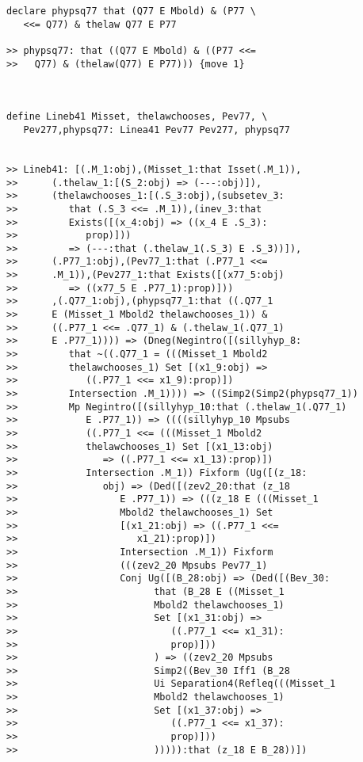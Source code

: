 \documentclass[12pt]{article}
\begin{document}
\begin{verbatim}
declare phypsq77 that (Q77 E Mbold) & (P77 \
   <<= Q77) & thelaw Q77 E P77

>> phypsq77: that ((Q77 E Mbold) & ((P77 <<=
>>   Q77) & (thelaw(Q77) E P77))) {move 1}



define Lineb41 Misset, thelawchooses, Pev77, \
   Pev277,phypsq77: Linea41 Pev77 Pev277, phypsq77


>> Lineb41: [(.M_1:obj),(Misset_1:that Isset(.M_1)),
>>      (.thelaw_1:[(S_2:obj) => (---:obj)]),
>>      (thelawchooses_1:[(.S_3:obj),(subsetev_3:
>>         that (.S_3 <<= .M_1)),(inev_3:that
>>         Exists([(x_4:obj) => ((x_4 E .S_3):
>>            prop)]))
>>         => (---:that (.thelaw_1(.S_3) E .S_3))]),
>>      (.P77_1:obj),(Pev77_1:that (.P77_1 <<=
>>      .M_1)),(Pev277_1:that Exists([(x77_5:obj)
>>         => ((x77_5 E .P77_1):prop)]))
>>      ,(.Q77_1:obj),(phypsq77_1:that ((.Q77_1
>>      E (Misset_1 Mbold2 thelawchooses_1)) &
>>      ((.P77_1 <<= .Q77_1) & (.thelaw_1(.Q77_1)
>>      E .P77_1)))) => (Dneg(Negintro([(sillyhyp_8:
>>         that ~((.Q77_1 = (((Misset_1 Mbold2
>>         thelawchooses_1) Set [(x1_9:obj) =>
>>            ((.P77_1 <<= x1_9):prop)])
>>         Intersection .M_1)))) => ((Simp2(Simp2(phypsq77_1))
>>         Mp Negintro([(sillyhyp_10:that (.thelaw_1(.Q77_1)
>>            E .P77_1)) => ((((sillyhyp_10 Mpsubs
>>            ((.P77_1 <<= (((Misset_1 Mbold2
>>            thelawchooses_1) Set [(x1_13:obj)
>>               => ((.P77_1 <<= x1_13):prop)])
>>            Intersection .M_1)) Fixform (Ug([(z_18:
>>               obj) => (Ded([(zev2_20:that (z_18
>>                  E .P77_1)) => (((z_18 E (((Misset_1
>>                  Mbold2 thelawchooses_1) Set
>>                  [(x1_21:obj) => ((.P77_1 <<=
>>                     x1_21):prop)])
>>                  Intersection .M_1)) Fixform
>>                  (((zev2_20 Mpsubs Pev77_1)
>>                  Conj Ug([(B_28:obj) => (Ded([(Bev_30:
>>                        that (B_28 E ((Misset_1
>>                        Mbold2 thelawchooses_1)
>>                        Set [(x1_31:obj) =>
>>                           ((.P77_1 <<= x1_31):
>>                           prop)]))
>>                        ) => ((zev2_20 Mpsubs
>>                        Simp2((Bev_30 Iff1 (B_28
>>                        Ui Separation4(Refleq(((Misset_1
>>                        Mbold2 thelawchooses_1)
>>                        Set [(x1_37:obj) =>
>>                           ((.P77_1 <<= x1_37):
>>                           prop)]))
>>                        ))))):that (z_18 E B_28))])

\end{verbatim}
\end{document}
